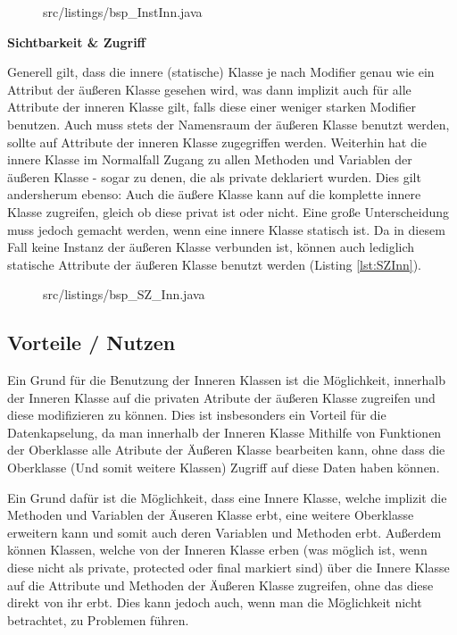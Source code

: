 \begin{figure}[hbt]
\lstset{language=Java}
 {src/listings/bsp_InstInn.java}
\end{figure}


{\bf Sichtbarkeit \& Zugriff}

Generell gilt, dass die innere (statische) Klasse je nach Modifier genau wie ein Attribut der äußeren Klasse gesehen wird, was dann implizit auch für alle Attribute der inneren Klasse gilt, falls diese einer weniger starken Modifier benutzen.
Auch muss stets der Namensraum der äußeren Klasse benutzt werden, sollte auf Attribute der inneren Klasse zugegriffen werden.
Weiterhin hat die innere Klasse im Normalfall Zugang zu allen Methoden und Variablen der äußeren Klasse - sogar zu denen, die als private deklariert wurden.
Dies gilt andersherum ebenso: Auch die äußere Klasse kann auf die komplette innere Klasse zugreifen, gleich ob diese privat ist oder nicht.
Eine große Unterscheidung muss jedoch gemacht werden, wenn eine innere Klasse statisch ist. Da in diesem Fall keine Instanz der äußeren Klasse verbunden ist, können auch lediglich statische Attribute der äußeren Klasse benutzt werden (Listing \ref{lst:SZInn}).

\begin{figure}[hbt]
\lstset{language=Java}
 {src/listings/bsp_SZ_Inn.java}
\end{figure}


\subsection{Vorteile / Nutzen}

Ein Grund für die Benutzung der Inneren Klassen ist die Möglichkeit, innerhalb der Inneren Klasse auf die privaten Atribute der äußeren Klasse zugreifen und diese modifizieren zu können.
Dies ist insbesonders ein Vorteil für die Datenkapselung, da man innerhalb der Inneren Klasse Mithilfe von Funktionen der Oberklasse alle Atribute der Äußeren Klasse bearbeiten kann, ohne dass die Oberklasse (Und somit weitere Klassen) Zugriff auf diese Daten haben können.

Ein Grund dafür ist die Möglichkeit, dass eine Innere Klasse, welche implizit die Methoden und Variablen der Äuseren Klasse erbt, eine weitere Oberklasse erweitern kann und somit auch deren Variablen und Methoden erbt.
Außerdem können Klassen, welche von der Inneren Klasse erben (was möglich ist, wenn diese nicht als private, protected oder final markiert sind) über die Innere Klasse auf die Attribute und Methoden der Äußeren Klasse zugreifen, ohne das diese direkt von ihr erbt. Dies kann jedoch auch, wenn man die Möglichkeit nicht betrachtet, zu Problemen führen.

